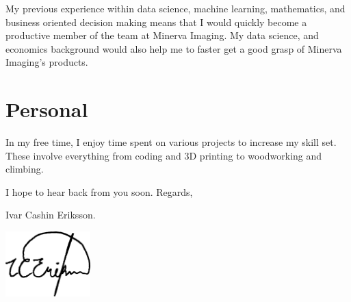 \documentclass[10pt,a4paper,sans]{moderncv}
\newcommand{\company}{Minerva Imaging}
\begin{document}


\hspace{7 mm} My previous experience within data science, machine learning, mathematics, and business oriented decision making means that I would quickly become a productive member of the team at \company{}. My data science, and economics background would also help me to faster get a good grasp of \company{}'s products.

\section{Personal}
In my free time, I enjoy time spent on various projects to increase my skill set. These involve everything from coding and 3D printing to woodworking and climbing.


\vspace{3 mm}
I hope to hear back from you soon. Regards, 

\vspace{3 mm} 
Ivar Cashin Eriksson. 

\vspace{-14mm}
\hfill \includegraphics[height=2.5cm]{assets/Signature_Vectorised.pdf}
\end{document}
